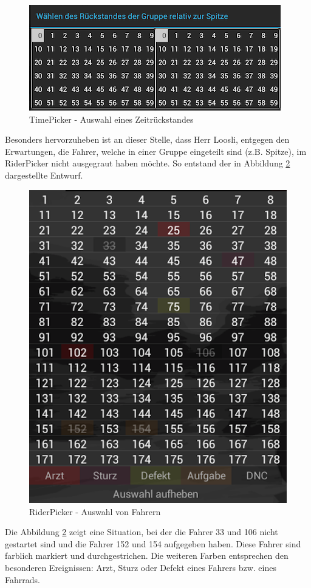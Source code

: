 \begin{figure}[h!]
\caption{TimePicker - Auswahl eines Zeitrückstandes}
\label{fig:timepicker}
\centering
\includegraphics[scale=0.8]{05bericht/images/timepicker.png}
\end{figure} 
Besonders hervorzuheben ist an dieser Stelle, dass Herr Loosli, entgegen den Erwartungen, die Fahrer, welche in einer Gruppe eingeteilt sind (z.B. Spitze), im RiderPicker nicht ausgegraut haben möchte. So entstand der in Abbildung \ref{fig:riderpicker} dargestellte Entwurf.

\begin{figure}[h!]
\caption{RiderPicker - Auswahl von Fahrern}
\label{fig:riderpicker}
\centering
\includegraphics[scale=0.5]{05bericht/images/riderpicker.png}
\end{figure}

Die Abbildung \ref{fig:riderpicker} zeigt eine Situation, bei der die Fahrer 33 und 106 nicht gestartet sind und die Fahrer 152 und 154 aufgegeben haben. Diese Fahrer sind farblich markiert und durchgestrichen. Die weiteren Farben entsprechen den besonderen Ereignissen: Arzt, Sturz oder Defekt eines Fahrers bzw. eines Fahrrads.

